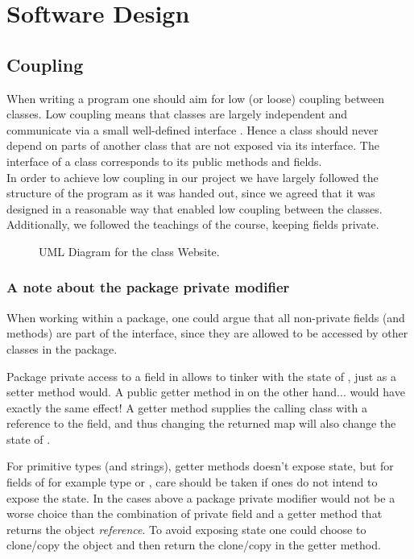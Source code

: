 \section{Software Design}

\subsection{Coupling}
When writing a program one should aim for low (or loose) coupling between classes. Low coupling means that classes are largely independent and communicate via a small well-defined interface \cite[p.259]{BK}. Hence a class should never depend on parts of another class that are not exposed via its interface. The interface of a class corresponds to its public methods and fields.
\\
In order to achieve low coupling in our project we have largely followed the structure of the program as it was handed out, since we agreed that it was designed in a reasonable way that enabled low coupling between the classes. Additionally, we followed the teachings of the course, keeping fields private.

 \begin{figure}[t]
	\centering
	\caption{UML Diagram for the class Website.}
	\label{fig:uml:single-class-website}
\end{figure}

 
 \subsubsection{A note about the package private modifier}
When working within a package, one could argue that all non-private fields (and methods) are part of the interface, since they are allowed to be accessed by other classes in the package. 
 
Package private access to a field in  allows  to tinker with the state of , just as a setter method would.
A public getter method in  on the other hand... would have exactly the same effect!
A getter method supplies the calling class  with a reference to the field, and thus changing the returned map will also change the state of .
 
For primitive types (and strings), getter methods doesn't expose state, but for fields of for example type   or , care should be taken if ones do not intend to expose the state.
In the cases above a package private modifier would not be a worse choice than the combination of private field and a getter method that returns the object \emph{reference}. To avoid exposing state one could choose to clone/copy the object and then return the clone/copy in the getter method.

